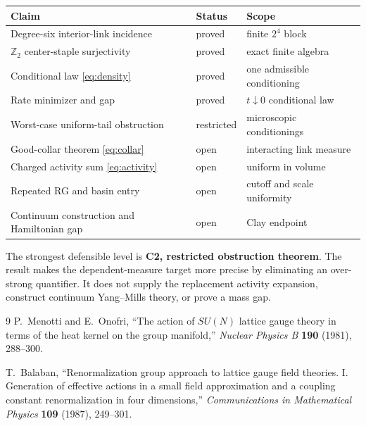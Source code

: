 \documentclass[11pt]{article}
\theoremstyle{definition}
\newcommand{\Ztwo}{\mathbb Z_2}
\newcommand{\proved}{\textcolor{green!45!black}{\textsf{proved}}}
\newcommand{\restricted}{\textcolor{blue!65!black}{\textsf{restricted}}}
\newcommand{\openstatus}{\textcolor{red!70!black}{\textsf{open}}}
\begin{document}
\begin{longtable}{@{}p{}p{}p{}@{}}
\toprule
Claim & Status & Scope \\
\midrule
\endhead
Degree-six interior-link incidence & \proved & finite $2^4$ block \\
$\Ztwo$ center-staple surjectivity & \proved & exact finite algebra \\
Conditional law \eqref{eq:density} & \proved & one admissible conditioning \\
Rate minimizer and gap & \proved & $t\downarrow0$ conditional law \\
Worst-case uniform-tail obstruction & \restricted & microscopic conditionings \\
Good-collar theorem \eqref{eq:collar} & \openstatus & interacting link measure \\
Charged activity sum \eqref{eq:activity} & \openstatus & uniform in volume \\
Repeated RG and basin entry & \openstatus & cutoff and scale uniformity \\
Continuum construction and Hamiltonian gap & \openstatus & Clay endpoint \\
\bottomrule
\end{longtable}

The strongest defensible level is \textbf{C2, restricted obstruction
theorem}.  The result makes the dependent-measure target more precise by
eliminating an over-strong quantifier.  It does not supply the replacement
activity expansion, construct continuum Yang--Mills theory, or prove a mass
gap.

\begin{thebibliography}{9}
P.~Menotti and E.~Onofri,
``The action of $SU(N)$ lattice gauge theory in terms of the heat kernel on the
group manifold,''
\emph{Nuclear Physics B} \textbf{190} (1981), 288--300.

T.~Balaban,
``Renormalization group approach to lattice gauge field theories. I.
Generation of effective actions in a small field approximation and a coupling
constant renormalization in four dimensions,''
\emph{Communications in Mathematical Physics} \textbf{109} (1987), 249--301.
\end{thebibliography}
\end{document}

